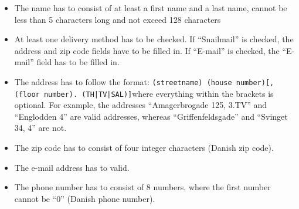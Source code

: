 		\begin{itemize}
			\item The name has to consist of at least a first name and a last name, cannot be less than 5 characters long and not exceed 128 characters
			\item At least one delivery method has to be checked. If ``Snailmail'' is checked, the address and zip code fields have to be filled in. If ``E-mail'' is checked, the ``E-mail'' field has to be filled in.
			\item The address has to follow the format: \newline\newline \texttt{(streetname) (house number)[, (floor number). (TH|TV|SAL)]}\newline\newline where everything within the brackets is optional. For example, the addresses ``Amagerbrogade 125, 3.TV'' and ``Englodden 4'' are valid addresses, whereas ``Griffenfeldsgade'' and ``Svinget 34, 4'' are not.
			\item The zip code has to consist of four integer characters (Danish zip code).
			\item The e-mail address has to valid.
			\item The phone number has to consist of 8 numbers, where the first number cannot be “0” (Danish phone number).
		\end{itemize}



			

